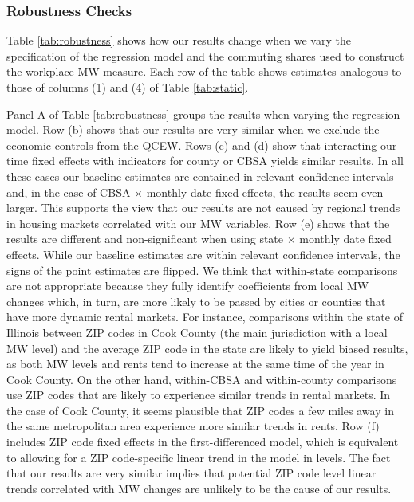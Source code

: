 \subsubsection*{Robustness Checks}

Table \ref{tab:robustness} shows how our results change when we vary the
specification of the regression model and the commuting shares used 
to construct the workplace MW measure.
Each row of the table shows estimates analogous to those of columns (1) and (4)
of Table \ref{tab:static}.

Panel A of Table \ref{tab:robustness} groups the results when varying the 
regression model.
Row (b) shows that our results are very similar when we exclude the 
economic controls from the QCEW.
Rows (c) and (d) show that interacting our time fixed effects with indicators 
for county or CBSA yields similar results.
In all these cases our baseline estimates are contained in relevant 
confidence intervals and, in the case of CBSA $\times$ monthly date fixed 
effects, the results seem even larger.
This supports the view that our results are not caused by regional trends 
in housing markets correlated with our MW variables.
Row (e) shows that the results are different and non-significant when using 
state $\times$ monthly date fixed effects.
While our baseline estimates are within relevant confidence intervals, the 
signs of the point estimates are flipped.
We think that within-state comparisons are not appropriate because they fully 
identify coefficients from local MW changes which, in turn, are more likely to 
be passed by cities or counties that have more dynamic rental markets.
For instance, comparisons within the state of Illinois between ZIP codes in 
Cook County (the main jurisdiction with a local MW level) and the average
ZIP code in the state are likely to yield biased results, as both MW levels and
rents tend to increase at the same time of the year in Cook County.
On the other hand, within-CBSA and within-county comparisons use ZIP codes that
are likely to experience similar trends in rental markets.
In the case of Cook County, it seems plausible that ZIP codes a few miles away
in the same metropolitan area experience more similar trends in rents.
Row (f) includes ZIP code fixed effects in the first-differenced model, which
is equivalent to allowing for a ZIP code-specific linear trend in the model in 
levels.
The fact that our results are very similar implies that potential ZIP code 
level linear trends correlated with MW changes are unlikely to be the cause
of our results.

